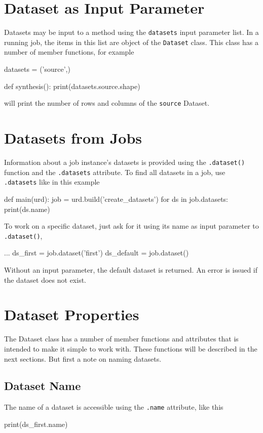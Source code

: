 \section{Dataset as Input Parameter}
Datasets may be input to a method using the \texttt{datasets} input
parameter list.  In a running job, the items in this list are object
of the \texttt{Dataset} class.  This class has a number of member
functions, for example
\begin{python}
datasets = ('source',)

def synthesis():
    print(datasets.source.shape)
\end{python}
will print the number of rows and columns of the \texttt{source}
Dataset.


\section{Datasets from Jobs}

Information about a job instance's datasets is provided using
the \texttt{.dataset()} function and the \texttt{.datasets} attribute.
To find all datasets in a job, use \texttt{.datasets} like in this
example
\begin{python}
def main(urd):
    job = urd.build('create_datasets')
    for ds in job.datasets:
        print(ds.name)
\end{python}
To work on a specific dataset, just ask for it using its name as input
parameter to \texttt{.dataset()},
\begin{python}
    ...
    ds_first = job.dataset('first')
    ds_default = job.dataset()
\end{python}
Without an input parameter, the default dataset is returned.  An error
is issued if the dataset does not exist.

                      

\section{Dataset Properties}
The Dataset class has a number of member functions and attributes that
is intended to make it simple to work with.  These functions will be
described in the next sections.  But first a note on naming datasets.


\subsection{Dataset Name}
The name of a dataset is accessible using the \texttt{.name}
attribute, like this
\begin{python}
    print(ds_first.name)
\end{python}

